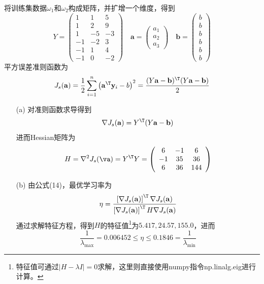 \documentclass[reportComp]{thesis}
\begin{document}
\begin{answer}
将训练集数据$\omega_1$和$\omega_2$构成矩阵，并扩增一个维度，得到
\[Y =\left(\begin{array}{rrr}{1} & {1} & {5} \\ {1} & {2} & {9} \\ {1} & {-5} & {-3} \\ {-1} & {-2} & {3} \\ {-1} & {1} & {4} \\ {-1} & {0} & {-2}\end{array}\right) \quad \mathbf{a}=\left(\begin{array}{r}{a_{1}} \\ {a_{2}} \\ {a_{3}}\end{array}\right) \quad \mathbf{b}=\left(\begin{array}{c}{b} \\ {b} \\ {b} \\ {b} \\ {b} \\ {b}\end{array}\right)\]
平方误差准则函数为
\[J_{s}(\mathbf{a})=\frac{1}{2} \sum_{i=1}^{n}\left(\mathbf{a}^\T  \mathbf{y}_{i}-b\right)^{2}=\frac{(Y  \mathbf{a}-\mathbf{b})^\T (Y  \mathbf{a}-\mathbf{b})}{2}\]
\begin{itemize}
	\item [(a)] 对准则函数求导得到
	\[\nabla J_{s}(\mathbf{a})=Y^\T (Y  \mathbf{a}-\mathbf{b})\]
	进而Hessian矩阵为
	\[H =\nabla^2 J_s(\va)=Y ^\T  Y =\left(\begin{array}{ccc}{6} & {-1} & {6} \\ {-1} & {35} & {36} \\ {6} & {36} & {144}\end{array}\right)\]
	\item [(b)] 由公式(14)，最优学习率为
	\[\eta=\frac{\left[\nabla J_{s}(\mathbf{a})\right]^\T  \nabla J_{s}(\mathbf{a})}{\left[\nabla J_{s}(\mathbf{a})\right]^\T  H  \nabla J_{s}(\mathbf{a})}\]
	通过求解特征方程，得到$H$的特征值\footnote{特征值可通过$|H-\lambda I|=0$求解，这里则直接使用numpy指令np.linalg.eig进行计算。}为$5.417,24.57,155.0$，进而
	\[\frac{1}{\lambda_{\max}}=0.006452\leq\eta\leq 0.1846=\frac{1}{\lambda_{\min}}\]
\end{itemize}
\end{answer}
\end{document}
